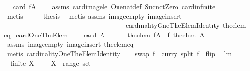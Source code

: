 \begin{isabellebody}
\ \isamarkupfalse%
\ {\isachardoublequoteopen}card\ {\isacharparenleft}f{\isacharbackquote}A{\isacharparenright}\ {\isasymle}\ {}{\isachardoublequoteclose}\ \isamarkupfalse%
\ assms\ card{\isacharunderscore}image{\isacharunderscore}le\ One{\isacharunderscore}nat{\isacharunderscore}def\ Suc{\isacharunderscore}not{\isacharunderscore}Zero\ card{\isacharunderscore}infinite\isanewline
\ \ \ \ \ \ \ \isamarkupfalse%
\ {\isacharparenleft}metis{\isacharparenright}\isanewline
\ \ \isamarkupfalse%
\ \isamarkupfalse%
\ {\isacharquery}thesis\ \isamarkupfalse%
\ {\isacharparenleft}metis\ assms\ image{\isacharunderscore}empty\ image{\isacharunderscore}insert\ \isanewline
\ \ \ \ \ \ \ \ \ \ \ \ \ \ \ \ \ \ \ \ \ \ \ \ \ \ \ \ \ \ \ \ \ \ \ \ cardinalityOneTheElemIdentity\ the{\isacharunderscore}elem{\isacharunderscore}eq{\isacharparenright}\isanewline
{}\isamarkupfalse%
%
\endisatagproof
{\isafoldproof}%
%
\isadelimproof
\isanewline
%
\endisadelimproof
\isanewline
{}\isamarkupfalse%
\ cardOneTheElem{\isacharcolon}\ \isanewline
\ \ \ {\isachardoublequoteopen}card\ A\ {\isacharequal}\ {}{\isachardoublequoteclose}\ \isanewline
\ \ \ {\isachardoublequoteopen}the{\isacharunderscore}elem\ {\isacharparenleft}f{\isacharbackquote}A{\isacharparenright}\ {\isacharequal}\ f\ {\isacharparenleft}the{\isacharunderscore}elem\ A{\isacharparenright}{\isachardoublequoteclose}\ \isanewline
%
\isadelimproof
\ \ %
\endisadelimproof
%
\isatagproof
{}\isamarkupfalse%
\ assms\ image{\isacharunderscore}empty\ image{\isacharunderscore}insert\ the{\isacharunderscore}elem{\isacharunderscore}eq\ \isamarkupfalse%
\ {\isacharparenleft}metis\ cardinalityOneTheElemIdentity{\isacharparenright}%
\endisatagproof
{\isafoldproof}%
%
\isadelimproof
\isanewline
%
\endisadelimproof
\isanewline
\isanewline
{}\isamarkupfalse%
\ \isanewline
\ \ {\isachardoublequoteopen}swap\ f\ {\isacharequal}{\isacharequal}\ curry\ {\isacharparenleft}{\isacharparenleft}split\ f{\isacharparenright}\ {\isasymcirc}\ flip{\isacharparenright}{\isachardoublequoteclose}\ \isanewline
\isanewline
\isanewline
{}\isamarkupfalse%
\ lm{}{}{}{\isacharcolon}\ \isanewline
\ \ {\isachardoublequoteopen}finite\ X\ \ \ {\isacharequal}\ \ {\isacharparenleft}X\ {\isasymin}\ range\ set{\isacharparenright}{\isachardoublequoteclose}\ \isanewline
%
\isadelimproof

\end{isabellebody}
